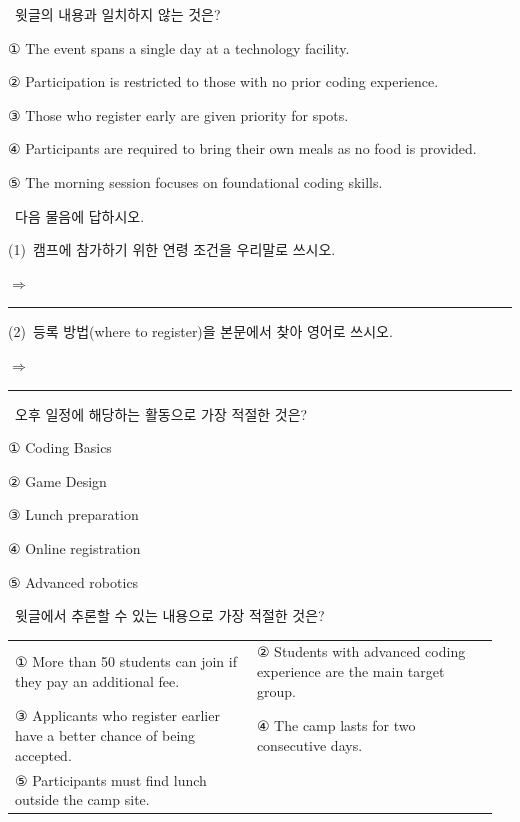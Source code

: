 \documentclass[11pt,a4paper]{article}
\newcommand{\qno}[1]{\par\vspace{5pt}\noindent{\sffamily\bfseries #1.}\ }
\newcommand{\instr}[1]{{\sffamily #1}\par\vspace{2pt}}
\begin{document}
\vspace{6pt}

\qno{1}\instr{윗글의 내용과 일치하지 않는 것은?}
\begin{choices}
  \item ① The event spans a single day at a technology facility.
  \item ② Participation is restricted to those with no prior coding experience.
  \item ③ Those who register early are given priority for spots.
  \item ④ Participants are required to bring their own meals as no food is provided.
  \item ⑤ The morning session focuses on foundational coding skills.
\end{choices}

\vspace{10pt}

\qno{2}\instr{[서술형] 다음 물음에 답하시오.}

\noindent (1)\ 캠프에 참가하기 위한 연령 조건을 우리말로 쓰시오.

\vspace{4pt}
\noindent $\Rightarrow$ \rule{10cm}{0.4pt}

\vspace{10pt}

\noindent (2)\ 등록 방법(where to register)을 본문에서 찾아 영어로 쓰시오.

\vspace{4pt}
\noindent $\Rightarrow$ \rule{10cm}{0.4pt}

\qno{3}\instr{오후 일정에 해당하는 활동으로 가장 적절한 것은?}
\begin{choices}
  \item ① Coding Basics
  \item ② Game Design
  \item ③ Lunch preparation
  \item ④ Online registration
  \item ⑤ Advanced robotics
\end{choices}

\qno{4}\instr{윗글에서 추론할 수 있는 내용으로 가장 적절한 것은?}
\footnotesize
\begin{tabular}{@{}p{0.48\linewidth}p{0.48\linewidth}@{}}
① More than 50 students can join if they pay an additional fee. &
② Students with advanced coding experience are the main target group. \\
③ Applicants who register earlier have a better chance of being accepted. &
④ The camp lasts for two consecutive days. \\
⑤ Participants must find lunch outside the camp site. &
\end{tabular}
\normalsize
\end{document}
